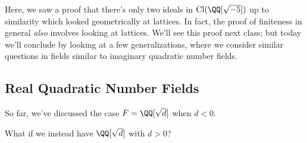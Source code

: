



Here, we saw a proof that there's only two ideals in $\operatorname{Cl}(\QQ[\sqrt{-5}])$ up to similarity which looked geometrically at lattices. In fact, the proof of finiteness in general \emph{also} involves looking at lattices. We'll see this proof next class; but today we'll conclude by looking at a few generalizations, where we consider similar questions in fields similar to imaginary quadratic number fields. 

\subsection{Real Quadratic Number Fields}

So far, we've discussed the case $F = \QQ[\sqrt{d}]$ when $d < 0$.

\begin{qq}
What if we instead have $\QQ[\sqrt{d}]$ with $d > 0$?
\end{qq}

